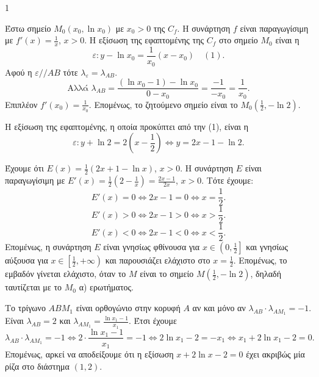 \begin{ylh}{1}
    \item [Ανάλυση συνάρτησης, Διαφορικός Λογισμός, Εμβαδόν, Γεωμετρία]
\end{ylh}
\begin{alist}
\item \begin{rlist}
    \item [i.] Έστω σημείο $M_0(x_0, \ln x_0)$ με $x_0 > 0$ της $C_f$.
    Η συνάρτηση $f$ είναι παραγωγίσιμη με $f'(x) = \frac{1}{x}$, $x > 0$.
    Η εξίσωση της εφαπτομένης της $C_f$ στο σημείο $M_0$ είναι η
    \[ \varepsilon: y - \ln x_0 = \frac{1}{x_0}(x - x_0) \quad (1). \]
    Αφού η $\varepsilon // AB$ τότε $\lambda_\varepsilon = \lambda_{AB}$.
    \[ \text{Αλλά } \lambda_{AB} = \frac{(\ln x_0 - 1) - \ln x_0}{0 - x_0} = \frac{-1}{-x_0} = \frac{1}{x_0}. \]
    Επιπλέον $f'(x_0) = \frac{1}{x_0}$. Επομένως, το ζητούμενο σημείο είναι το $M_0\left(\frac{1}{2}, -\ln 2\right)$. 
    \item [ii.] Η εξίσωση της εφαπτομένης, η οποία προκύπτει από την (1), είναι η
    \[ \varepsilon: y + \ln 2 = 2\left(x - \frac{1}{2}\right) \Leftrightarrow y = 2x - 1 - \ln 2. \] 
\end{rlist}
\item [β)] Έχουμε ότι $E(x) = \frac{1}{2}(2x + 1 - \ln x)$, $x > 0$.
Η συνάρτηση $E$ είναι παραγωγίσιμη με $E'(x) = \frac{1}{2}\left(2 - \frac{1}{x}\right) = \frac{2x - 1}{2x}$, $x > 0$.
Τότε έχουμε:
\[ E'(x) = 0 \Leftrightarrow 2x - 1 = 0 \Leftrightarrow x = \frac{1}{2}. \]
\[ E'(x) > 0 \Leftrightarrow 2x - 1 > 0 \Leftrightarrow x > \frac{1}{2}. \]
\[ E'(x) < 0 \Leftrightarrow 2x - 1 < 0 \Leftrightarrow x < \frac{1}{2}. \]
Επομένως, η συνάρτηση $E$ είναι γνησίως φθίνουσα για $x \in \left(0, \frac{1}{2}\right]$ και γνησίως αύξουσα για $x \in \left[\frac{1}{2}, +\infty\right)$ και παρουσιάζει ελάχιστο στο $x = \frac{1}{2}$.
Επομένως, το εμβαδόν γίνεται ελάχιστο, όταν το $M$ είναι το σημείο $M\left(\frac{1}{2}, -\ln 2\right)$, δηλαδή ταυτίζεται με το $M_0$ α) ερωτήματος. 
\item [γ)] Το τρίγωνο $ABM_1$ είναι ορθογώνιο στην κορυφή $A$ αν και μόνο αν $\lambda_{AB} \cdot \lambda_{AM_1} = -1$.
Είναι $\lambda_{AB} = 2$ και $\lambda_{AM_1} = \frac{\ln x_1 - 1}{x_1}$.
Έτσι έχουμε
\[ \lambda_{AB} \cdot \lambda_{AM_1} = -1 \Leftrightarrow 2 \cdot \frac{\ln x_1 - 1}{x_1} = -1 \Leftrightarrow 2\ln x_1 - 2 = -x_1 \Leftrightarrow x_1 + 2\ln x_1 - 2 = 0. \]
Επομένως, αρκεί να αποδείξουμε ότι η εξίσωση $x + 2\ln x - 2 = 0$ έχει ακριβώς μία ρίζα στο διάστημα $(1,2)$.

\end{alist}
